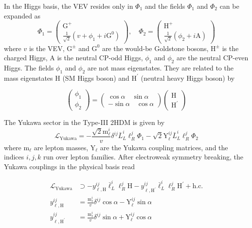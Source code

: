 In the Higgs basis, the VEV resides only in $\Phi_{1}$ and the fields $\Phi_{1}$ and $\Phi_{2}$ can be expanded as
%
\begin{equation}
  \Phi_{1}=\left(\begin{array}{c} \text{G}^{+} \\ \frac{1}{\sqrt{2}}\left(v+\phi_{1}+i \text{G}^{0}\right) \end{array}\right), \quad
  \Phi_{2}=\left(\begin{array}{c} \text{H}^{+} \\ \frac{1}{\sqrt{2}}\left(\phi_{2}+i \text{A}\right) \end{array}\right)
\end{equation}
%
where $v$ is the VEV, $\text{G}^{\pm}$ and $\text{G}^0$ are the would-be Goldstone bosons, $\text{H}^{\pm}$ is the charged Higgs, A is the neutral CP-odd Higgs, $\phi_{1}$ and $\phi_{2}$ are the neutral CP-even Higgs. The fields $\phi_{1}$ and $\phi_{2}$ are not mass eigenstates. They are related to the mass eigenstates H (SM Higgs boson) and $\text{H}^{'}$ (neutral heavy Higgs boson) by

\begin{equation}
  \left(\begin{array}{l} \phi_{1} \\ \phi_{2} \end{array}\right) = \left(\begin{array}{r} \cos \alpha \quad \sin \alpha \\ -\sin \alpha \quad \cos \alpha \end{array}\right)\left(\begin{array}{l} \text{H} \\ \text{H}^{'} \end{array}\right)
\end{equation}

The Yukawa sector in the Type-III 2HDM is given by
%
\begin{equation}
  \mathcal{L}_{\text{Yukawa}}=-\frac{\sqrt{2} \text{m}_{\ell}^{i}}{v} \delta^{i j} \bar{L}_{L}^{i} \ell_{R}^{j} \Phi_{1}-\sqrt{2} \text{Y}_{\ell}^{i j} \bar{L}_{L}^{i} \ell_{R}^{j} \Phi_{2}
\end{equation}
%
where $\text{m}_{\ell}$ are lepton masses, $\text{Y}_{\ell}$ are the Yukawa coupling matrices, and the indices $i, j, k$ run over lepton families. After electroweak symmetry breaking, the Yukawa couplings in the physical basis read

\begin{equation}
  \begin{aligned}
    \mathcal{L}_{\text{Yukawa}} &\supset -y_{\ell, \text{H}}^{i j} \bar{\ell}_{L}^{i} \ell_{R}^{j} \text{H} - y_{\ell, \text{H}^{'}}^{i j} \bar{\ell}_{L}^{i} \ell_{R}^{j} \text{H}^{'} + \text{h.c.} \\
    y_{\ell, \text{H}}^{i j} &=\frac{\text{m}_{\ell}^{i}}{v} \delta^{i j} \cos \alpha - \text{Y}_{\ell}^{i j} \sin \alpha \\
    y_{\ell, \text{H}^{'}}^{i j} &=\frac{\text{m}_{\ell}^{i}}{v} \delta^{i j} \sin \alpha + \text{Y}_{\ell}^{i j} \cos \alpha
  \end{aligned}
\end{equation}

